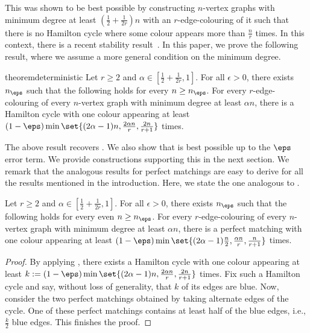 \documentclass[10pt,a4paper,reqno]{amsart}
\begin{document}
This was shown to be best possible by constructing $n$-vertex graphs with minimum degree at least $\left(\frac{1}{2} + \frac{1}{2r}\right)n$ with an $r$-edge-colouring of it such that there is no Hamilton cycle where some colour appears more than $\frac{n}{r}$ times. In this context, there is a recent stability result~\cite{Chen2025optimal}. In this paper, we prove the following result, where we assume a more general condition on the minimum degree.
\begin{restatable}{theorem}{deterministic}\label{thm:deterministic main}
  Let $r\ge 2$ and $\alpha\in [\frac{1}{2} + \frac{1}{2r}, 1]$. For all $\epsilon >0$, there exists $n_\eps$ such that the following holds for every $n\ge n_\eps$. 
  For every $r$-edge-colouring of every $n$-vertex graph with minimum degree at least $\alpha n$, there is a Hamilton cycle with one colour appearing at least $(1-\eps) \min\set{(2\alpha - 1)n, \frac{2\alpha n}{r}, \frac{2n}{r+1}}$ times.
\end{restatable}
The above result recovers . We also show that  is best possible up to the $\eps$ error term. We provide constructions supporting this in the next section. We remark that the analogous results for perfect matchings are easy to derive for all the results mentioned in the introduction. Here, we state the one analogous to . 
\begin{corollary}\label{cor:main for perfect matching}
  Let $r\ge 2$ and $\alpha\in [\frac{1}{2} + \frac{1}{2r}, 1]$.  For all $\epsilon >0$, there exists $n_\eps$ such that the following holds for every even $n\ge n_\eps$. 
  For every $r$-edge-colouring of every $n$-vertex graph with minimum degree at least $\alpha n$, there is a perfect matching with one colour appearing at least $(1-\eps) \min\set{(2\alpha - 1)\frac{n}{2}, \frac{\alpha n}{r}, \frac{n}{r+1}}$ times.
\end{corollary}
\begin{proof}
    By applying , there exists a Hamilton cycle with one colour appearing at least $k:= (1-\eps) \min\set{(2\alpha - 1)n, \frac{2\alpha n}{r}, \frac{2n}{r+1}}$ times. Fix such a Hamilton cycle and say, without loss of generality, that $k$ of its edges are blue. Now, consider the two perfect matchings obtained by taking alternate edges of the cycle. One of these perfect matchings contains at least half of the blue edges, i.e., $\frac{k}{2}$ blue edges. This finishes the proof.
\end{proof}
\end{document}
